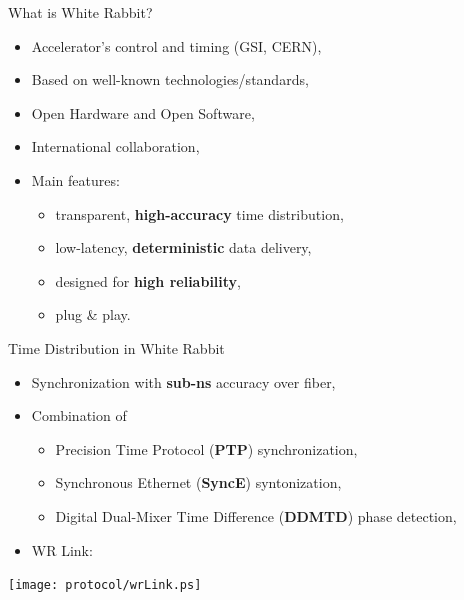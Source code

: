 \documentclass[compress,red]{beamer}
\begin{document}
% 
% 
\begin{frame}{What is White Rabbit?}

  \begin{itemize}
    \item Accelerator's control and timing (GSI, CERN),
    \item Based on well-known technologies/standards,
    \item Open Hardware and Open Software,
    \item International collaboration,
    \item Main features:
	\begin{itemize}
	  \item transparent,  {\bf high-accuracy} time distribution,
	  \item low-latency,  {\bf deterministic} data delivery,
	  \item designed for  {\bf high reliability},
	  \item plug \& play.
	\end{itemize}
  \end{itemize}

\end{frame}
\begin{frame}{Time Distribution in White Rabbit}

  \begin{itemize}
    \item Synchronization with {\bf sub-ns} accuracy over fiber,
    \item Combination of
	\begin{itemize}
	  \item Precision Time Protocol ({\bf PTP}) synchronization,
	  \item Synchronous Ethernet ({\bf SyncE}) syntonization,
	  \item Digital Dual-Mixer Time Difference ({\bf DDMTD}) phase detection,
	\end{itemize}
    \item WR Link:
  \end{itemize}

  \begin{center}
  \texttt{[image: protocol/wrLink.ps]}
  \end{center}

\end{frame}
\end{document}
